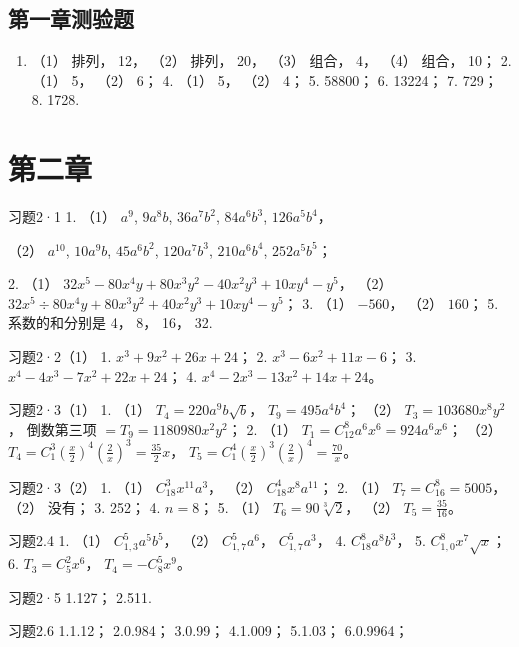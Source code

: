 \subsection{第一章测验题}

\begin{enumerate}
\item
  （1） 排列， 12， （2） 排列， 20， （3） 组合， 4， （4） 组合， 10；
  2. （1） 5， （2） 6； 4. （1） 5， （2） 4； 5. 58800； 6. 13224； 7.
  729； 8. 1728.
\end{enumerate}

\section{第二章}

习题2·1 1. （1） \(a^9\), \(9a^8b\), \(36a^7b^2\), \(84a^6b^3\), \(126a^5b^4\)，

（2） \(a^{10}\), \(10a^9b\), \(45a^6b^2\), \(120a^7b^3\), \(210a^6b^4\), \(252a^5b^5\)；

2. （1）
\(32x^5 - 80x^4y + 80x^3y^2 - 40x^2y^3 + 10xy^4 - y^5\)， （2）
\(32x^5 \div 80x^4y + 80x^3y^2 + 40x^2y^3 + 10xy^4 - y^5\)； 3. （1）
\(-560\)， （2） \(160\)； 5. 系数的和分别是 4， 8， 16， 32.

习题2·2（1） 1. \(x^{3} + 9x^{2} + 26x + 24\)； 2.
\(x^{3} - 6x^{2} + 11x - 6\)； 3.
\(x^{4} - 4x^{3} - 7x^{2} + 22x + 24\)； 4.
\(x^{4} - 2x^{3} - 13x^{2} + 14x + 24\)。

习题2·3（1） 1. （1） \(T_{4} = 220a^{9}b\sqrt{b}\)，
\(T_{9} = 495a^{4}b^{4}\)； （2） \(T_{3} = 103680x^{8}y^{2}\)，
倒数第三项 \(= T_{9} = 1180980x^{2}y^{2}\)； 2. （1）
\(T_{1} = C_{12}^{8}a^{6}x^{6} = 924a^{6}x^{6}\)； （2）
\(T_{4} = C_{1}^{3}\left(\frac{x}{2}\right)^{4}\left(\frac{2}{x}\right)^{3} = \frac{35}{2}x\)，
\(T_{5} = C_{1}^{4}\left(\frac{x}{2}\right)^{3}\left(\frac{2}{x}\right)^{4} = \frac{70}{x}\)。

习题2·3（2） 1. （1） \(C_{18}^{3}x^{11}a^{3}\)， （2）
\(C_{18}^{4}x^{8}a^{11}\)； 2. （1） \(T_{7} = C_{16}^{8} = 5005\)，
（2） 没有； 3. 252； 4. \(n = 8\)； 5. （1）
\(T_{6} = 90\sqrt[3]{2}\)， （2） \(T_{5} = \frac{35}{16}\)。

习题2.4 1. （1） \(C_{1,3}^{5}a^{5}b^{5}\)， （2）
\(C_{1,7}^{5}a^{6}\)， \(C_{1,7}^{5}a^{3}\)， 4.
\(C_{18}^{8}a^{8}b^{3}\)， 5. \(C_{1,0}^{8}x^{7}\sqrt{x}\)； 6.
\(T_{3} = C_{5}^{2}x^{6}\)， \(T_{4} = -C_{8}^{5}x^{9}\)。

习题2·5 1.127； 2.511.

习题2.6 1.1.12； 2.0.984； 3.0.99； 4.1.009； 5.1.03； 6.0.9964；

